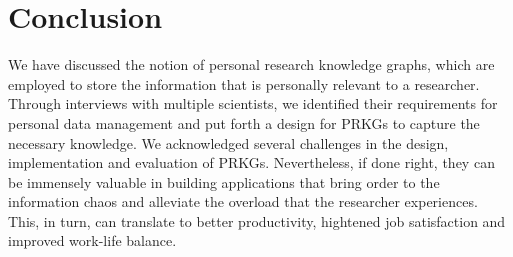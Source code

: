 \documentclass[11pt,pdftex]{article}
\begin{document}
\section{Conclusion} \label{prantika_sec:conclusion}
We have discussed the notion of personal research knowledge graphs, which are employed to store the information that is personally relevant to a researcher. Through interviews with multiple scientists, we identified their requirements for personal data management and put forth a design for PRKGs to capture the necessary knowledge. We acknowledged several challenges in the design, implementation and evaluation of PRKGs. Nevertheless, if done right, they can be immensely valuable in building applications that bring order to the information chaos and alleviate the overload that the researcher experiences. This, in turn, can translate to better productivity, hightened job  satisfaction and improved work-life balance. 


 

\end{document}
